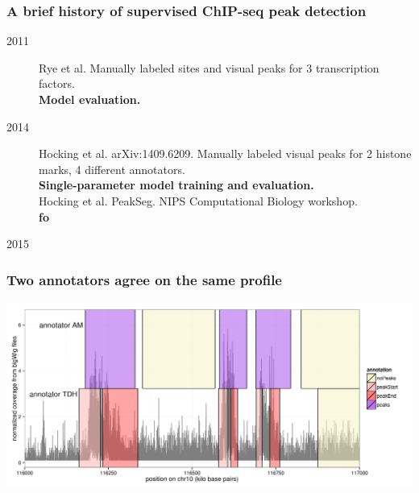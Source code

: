 \documentclass{beamer}
\begin{document}
\begin{frame}
  \frametitle{A brief history of supervised ChIP-seq peak detection}
  \begin{description}
  \item[2011] Rye et al. Manually labeled sites and visual peaks for 3
    transcription factors.\\
    \textbf{Model evaluation.}
  \item[2014] Hocking et al. arXiv:1409.6209. Manually labeled visual
    peaks for 2 histone marks, 4 different annotators.
    \\
    \textbf{Single-parameter model training and evaluation.}\\
    Hocking et al. PeakSeg. NIPS Computational Biology workshop.\\
    \textbf{fo}
  \item[2015] 
  \end{description}
\end{frame}

\begin{frame}
  \frametitle{Two annotators agree on the same profile}
  
  \includegraphics[width=\textwidth]{figure-several-annotators}
\end{frame}
\end{document}
